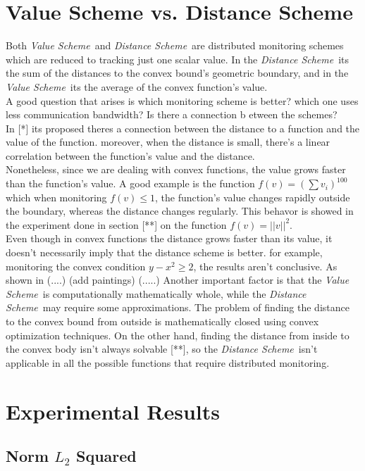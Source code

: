 \documentclass[10pt, conference]{IEEEtran}
\newcommand{\valueScheme}{\textit{Value Scheme}}
\newcommand{\distanceScheme}{\textit{Distance Scheme}}
\begin{document}
\section{Value Scheme vs. Distance Scheme}
Both \valueScheme \ and \distanceScheme \ are distributed monitoring schemes which are reduced to tracking just one scalar value. In the \distanceScheme \ its the sum of the distances to the convex bound's geometric boundary, and in the \valueScheme \ its the average of the convex function's value. \\
A good question that arises is which monitoring scheme is better? which one uses less communication bandwidth? Is there a connection b etween the schemes? \\
In [*] its proposed theres a connection between the distance to a function and the value of the function. moreover, when the distance is small, there's a linear correlation between the function's value and the distance. \\
Nonetheless, since we are dealing with convex functions, the value grows faster than the function's value. A good example is the function ${f(v) = (\sum v_i)^100}$ which  when monitoring ${f(v) \leq 1}$, the function's value changes rapidly outside the boundary, whereas the distance changes regularly.
This behavor is showed in the experiment done in section [**] on the function ${f(v) = ||v||^2}$. \\
Even though in convex functions the distance grows faster than its value, it doesn't necessarily imply that the distance scheme is better. for example, monitoring the convex condition $y-x^2 \geq 2$, the results aren't conclusive. As shown in (....) (add paintings)
(.....)
Another important factor is that the \valueScheme \ is computationally mathematically whole, while the \distanceScheme \ may require some approximations. The problem of finding the distance to the convex bound from outside is mathematically closed using convex optimization techniques. On the other hand, finding the distance from inside to the convex body isn't always solvable [**], so the \distanceScheme \ isn't applicable in all the possible functions that require distributed monitoring.

\section{Experimental Results}
\subsection{Norm $L_2$ Squared}
\end{document}
